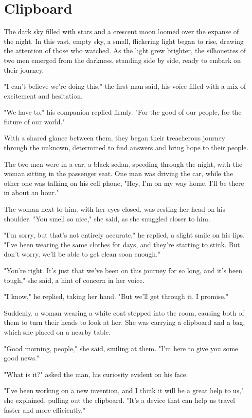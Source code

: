 \documentclass[smalldemyvopaper,11pt,twoside,onecolumn,openright,extrafontsizes]{memoir}
\begin{document}
\chapter{Clipboard}
The dark sky filled with stars and a crescent moon loomed over the expanse of the night. In this vast, empty sky, a small, flickering light began to rise, drawing the attention of those who watched. As the light grew brighter, the silhouettes of two men emerged from the darkness, standing side by side, ready to embark on their journey.\par
"I can't believe we're doing this," the first man said, his voice filled with a mix of excitement and hesitation.\par
"We have to," his companion replied firmly. "For the good of our people, for the future of our world."\par
With a shared glance between them, they began their treacherous journey through the unknown, determined to find answers and bring hope to their people.\par
The two men were in a car, a black sedan, speeding through the night, with the woman sitting in the passenger seat. One man was driving the car, while the other one was talking on his cell phone, "Hey, I'm on my way home. I'll be there in about an hour."\par
The woman next to him, with her eyes closed, was resting her head on his shoulder. "You smell so nice," she said, as she snuggled closer to him.\par
"I'm sorry, but that's not entirely accurate," he replied, a slight smile on his lips. "I've been wearing the same clothes for days, and they're starting to stink. But don't worry, we'll be able to get clean soon enough."\par
"You're right. It's just that we've been on this journey for so long, and it's been tough," she said, a hint of concern in her voice.\par
"I know," he replied, taking her hand. "But we'll get through it. I promise."\par
Suddenly, a woman wearing a white coat stepped into the room, causing both of them to turn their heads to look at her. She was carrying a clipboard and a bag, which she placed on a nearby table.\par
"Good morning, people," she said, smiling at them. "I'm here to give you some good news."\par
"What is it?" asked the man, his curiosity evident on his face.\par
"I've been working on a new invention, and I think it will be a great help to us," she explained, pulling out the clipboard. "It's a device that can help us travel faster and more efficiently."\par
\end{document}

